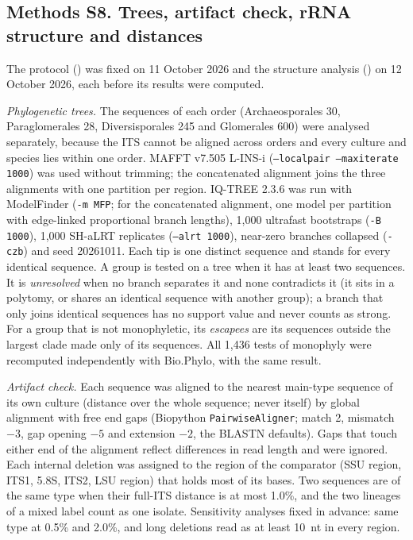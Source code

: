 \documentclass[11pt]{article}
\begin{document}
\subsection*{Methods S8. Trees, artifact check, rRNA structure and distances}
The protocol () was fixed on 11 October 2026 and the structure
analysis () on 12 October 2026, each before its results were computed.

\emph{Phylogenetic trees.} The sequences of each order (Archaeosporales 30, Paraglomerales 28, Diversisporales 245
and Glomerales 600) were analysed separately, because the ITS cannot be aligned across orders and every culture and
species lies within one order. MAFFT v7.505 L-INS-i (\texttt{--localpair --maxiterate 1000}) was used without
trimming; the concatenated alignment joins the three alignments with one partition per region. IQ-TREE 2.3.6 was run
with ModelFinder (\texttt{-m MFP}; for the concatenated alignment, one model per partition with edge-linked
proportional branch lengths), 1,000 ultrafast bootstraps (\texttt{-B 1000}), 1,000 SH-aLRT replicates
(\texttt{--alrt 1000}), near-zero branches collapsed (\texttt{-czb}) and seed 20261011. Each tip is one distinct
sequence and stands for every identical sequence. A group is tested on a tree when it has at least two sequences. It
is \emph{unresolved} when no branch separates it and none contradicts it (it sits in a polytomy, or shares an
identical sequence with another group); a branch that only joins identical sequences has no support value and never
counts as strong. For a group that is not monophyletic, its \emph{escapees} are its sequences outside the largest
clade made only of its sequences. All 1,436 tests of monophyly were recomputed independently with Bio.Phylo, with the
same result.

\emph{Artifact check.} Each sequence was aligned to the nearest main-type sequence of its own culture (distance over
the whole sequence; never itself) by global alignment with free end gaps (Biopython \texttt{PairwiseAligner}; match 2,
mismatch $-3$, gap opening $-5$ and extension $-2$, the BLASTN defaults). Gaps that touch either end of the alignment
reflect differences in read length and were ignored. Each internal deletion was assigned to the region of the
comparator (SSU region, ITS1, 5.8S, ITS2, LSU region) that holds most of its bases. Two sequences are of the same type
when their full-ITS distance is at most 1.0\%, and the two lineages of a mixed label count as one isolate. Sensitivity
analyses fixed in advance: same type at 0.5\% and 2.0\%, and long deletions read as at least 10~nt in every region.
\end{document}
